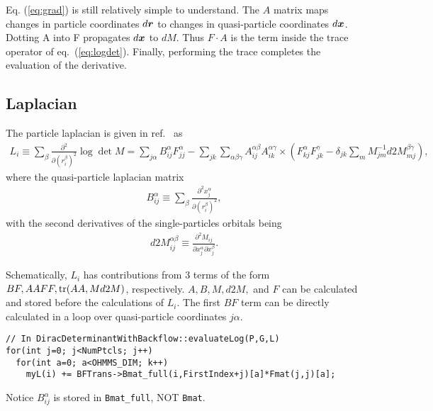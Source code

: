 Eq. (\ref{eq:grad}) is still relatively simple to understand. The $A$ matrix maps changes in particle coordinates $d\boldsymbol{r}$ to changes in quasi-particle coordinates $d\boldsymbol{x}$. Dotting A into F propagates $d\boldsymbol{x}$ to $dM$. Thus $F\cdot A$ is the term inside the trace operator of eq.~(\ref{eq:logdet}). Finally, performing the trace completes the evaluation of the derivative.

\subsection{Laplacian}
The particle laplacian is given in ref.~\cite{Kwon1993backflow} as
\begin{align}
L_i \equiv \sum\limits_{\beta} \frac{\partial^2}{\partial (r_i^\beta)^2} \log\det M = \sum\limits_{j\alpha} B_{ij}^\alpha F_{jj}^\alpha - \sum\limits_{jk}\sum\limits_{\alpha\beta\gamma} A_{ij}^{\alpha\beta}A_{ik}^{\alpha\gamma}\times\left(F_{kj}^\alpha F_{jk}^\gamma -\delta_{jk}\sum\limits_m M^{-1}_{jm} d2M_{mj}^{\beta\gamma}\right), \label{eq:lap}
\end{align}
where the quasi-particle laplacian matrix
\begin{align}
B_{ij}^{\alpha} \equiv \sum\limits_\beta \frac{\partial^2 x_j^\alpha}{\partial (r_i^\beta)^2},
\end{align}
with the second derivatives of the single-particles orbitals being
\begin{align}
d2M_{ij}^{\alpha\beta} \equiv \frac{\partial^2 M_{ij}}{\partial x_j^\alpha\partial x_j^\beta}.
\end{align}

Schematically, $L_i$ has contributions from 3 terms of the form $BF, AAFF, \text{tr}(AA,Md2M)$, respectively. $A, B, M ,d2M,$ and $F$ can be calculated and stored before the calculations of $L_i$. The first $BF$ term can be directly calculated in a loop over quasi-particle coordinates $j\alpha$.
\begin{lstlisting}
// In DiracDeterminantWithBackflow::evaluateLog(P,G,L)
for(int j=0; j<NumPtcls; j++)
  for(int a=0; a<OHMMS_DIM; k++)
    myL(i) += BFTrans->Bmat_full(i,FirstIndex+j)[a]*Fmat(j,j)[a];
\end{lstlisting}
Notice $B_{ij}^\alpha$ is stored in \verb|Bmat_full|, NOT \verb|Bmat|. 

